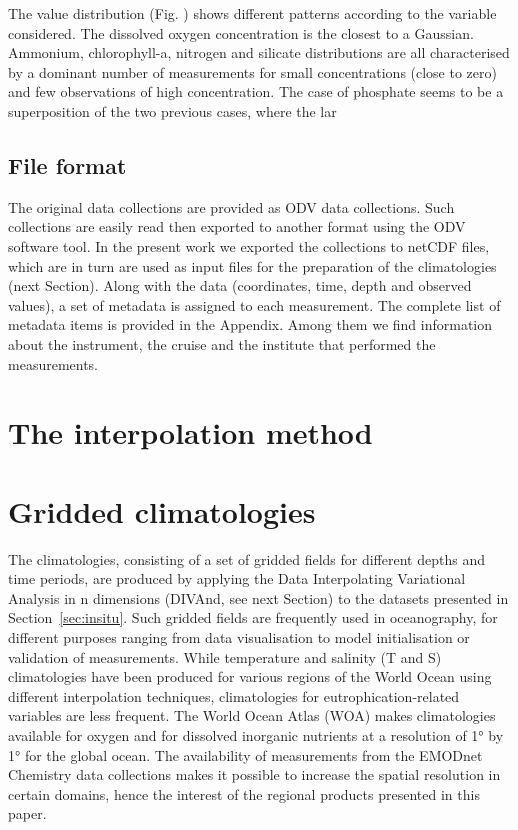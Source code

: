 \documentclass[essd, manuscript]{copernicus}
\begin{document}
The value distribution (Fig. ) shows different patterns according to the variable considered. The dissolved oxygen concentration is the closest to a Gaussian. Ammonium, chlorophyll-a, nitrogen and silicate distributions are all characterised by a dominant number of measurements for small concentrations (close to zero) and few observations of high concentration. The case of phosphate seems to be a superposition of the two previous cases, where the lar







\subsection{File format}
The original data collections are provided as ODV \citep[Ocean Data View,][]{SCHLITZER02} data collections. Such collections are easily read then exported to another format using the ODV software tool. In the present work we exported the collections to netCDF files, which are in turn are used as input files for the preparation of the climatologies (next Section). 
Along with the data (coordinates, time, depth and observed values), a set of metadata is assigned to each measurement. The complete list of metadata items is provided in the Appendix. Among them we find information about the instrument, the cruise and the institute that performed the measurements. 

\section{The interpolation method}


\section{Gridded climatologies\label{sec:clim}}

The climatologies, consisting of a set of gridded fields for different depths and time periods, are produced by applying the Data Interpolating Variational Analysis in n dimensions (DIVAnd, see next Section) to the datasets presented in Section~\ref{sec:insitu}. Such gridded fields are frequently used in oceanography, for different purposes ranging from data visualisation to model initialisation or validation of measurements.  
While temperature and salinity (T and S) climatologies have been produced for various regions of the World Ocean using different interpolation techniques, climatologies for eutrophication-related variables are less frequent. The World Ocean Atlas (WOA) makes climatologies available for oxygen \citep[Dissolved Oxygen, Apparent Oxygen Utilization, and Oxygen Saturation][]{GARCIA2018a} and for dissolved inorganic nutrients \citep[phosphate, nitrate and nitrate+nitrite, silicate][]{GARCIA2018b} at a resolution of 1° by 1° for the global ocean. The availability of measurements from the EMODnet Chemistry data collections makes it  possible to increase the spatial resolution in certain domains, hence the interest of the regional products presented in this paper.
\end{document}

